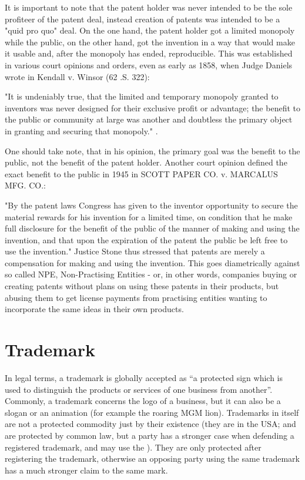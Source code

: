 \documentclass[a4paper]{report}
\begin{document}
It is important to note that the patent holder was never intended to be the sole profiteer of the patent deal, instead creation of patents was intended to be a "quid pro quo" deal. On the one hand, the patent holder got a limited monopoly while the public, on the other hand, got the invention in a way that would make it usable and, after the monopoly has ended, reproducible. This was established in various court opinions and orders, even as early as 1858, when Judge Daniels wrote in Kendall v. Winsor (62 .S. 322): 

"It is undeniably true, that the limited and temporary monopoly granted to inventors was never designed for their exclusive profit or advantage; the benefit to the public or community at large was another and doubtless the primary object in granting and securing that monopoly." \parencite{Curtis1858}.

One should take note, that in his opinion, the primary goal was the benefit to the public, not the benefit of the patent holder. Another court opinion defined the exact benefit to the public in 1945 in SCOTT PAPER CO. v. MARCALUS MFG. CO.:

"By the patent laws Congress has given to the inventor opportunity to secure the material rewards for his invention for a limited time, on condition that he make full disclosure for the benefit of the public of the manner of making and using the invention, and that upon the expiration of the patent the public be left free to use the invention." \parencite{Stone1945} Justice Stone thus stressed that patents are merely a compensation for making and using the invention. This goes diametrically against so called NPE, Non-Practising Entities - or, in other words, companies buying or creating patents without plans on using these patents in their products, but abusing them to get license payments from practising entities wanting to incorporate the same ideas in their own products.

\section{Trademark}
\label{sec:Trademark}
In legal terms, a trademark is globally accepted as \textquotedblleft a protected sign which is used to distinguish the products or services of one business from another\textquotedblright \parencite{SwissFederalInstituteofIntellectualProperty2017}.
Commonly, a trademark concerns the logo of a business, but it can also be a slogan or an animation (for example the roaring MGM lion).
Trademarks in itself are not a protected commodity just by their existence (they are in the USA; and are protected by common law, but a party has a stronger case when defending a registered trademark, and may use the \textregistered). They are only protected after registering the trademark, otherwise an opposing party using the same trademark has a much stronger claim to the same mark. \parencite{StatesPatent2016}
\end{document}
